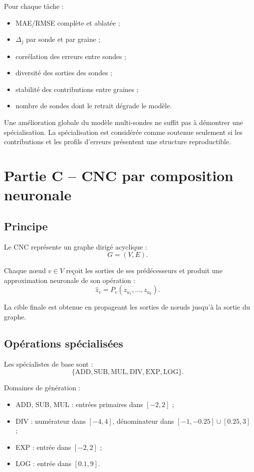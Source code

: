 \documentclass[11pt,a4paper]{article}
\begin{document}
Pour chaque tâche :
\begin{itemize}
  \item MAE/RMSE complète et ablatée ;
  \item $\Delta_j$ par sonde et par graine ;
  \item corrélation des erreurs entre sondes ;
  \item diversité des sorties des sondes ;
  \item stabilité des contributions entre graines ;
  \item nombre de sondes dont le retrait dégrade le modèle.
\end{itemize}

Une amélioration globale du modèle multi-sondes ne suffit pas à
démontrer une spécialisation. La spécialisation est considérée comme
soutenue seulement si les contributions et les profils d'erreurs
présentent une structure reproductible.

\section{Partie C -- CNC par composition neuronale}

\subsection{Principe}

Le CNC représente un graphe dirigé acyclique :
\[
G=(V,E).
\]

Chaque nœud $v\in V$ reçoit les sorties de ses prédécesseurs et produit
une approximation neuronale de son opération :
\[
\hat z_v=P_v(z_{u_1},\ldots,z_{u_k}).
\]

La cible finale est obtenue en propageant les sorties de nœuds jusqu'à
la sortie du graphe.

\subsection{Opérations spécialisées}

Les spécialistes de base sont :
\[
\{\mathrm{ADD,SUB,MUL,DIV,EXP,LOG}\}.
\]

Domaines de génération :
\begin{itemize}
  \item ADD, SUB, MUL : entrées primaires dans $[-2,2]$ ;
  \item DIV : numérateur dans $[-4,4]$, dénominateur dans
        $[-1,-0.25]\cup[0.25,3]$ ;
  \item EXP : entrée dans $[-2,2]$ ;
  \item LOG : entrée dans $[0.1,9]$.
\end{itemize}
\end{document}
